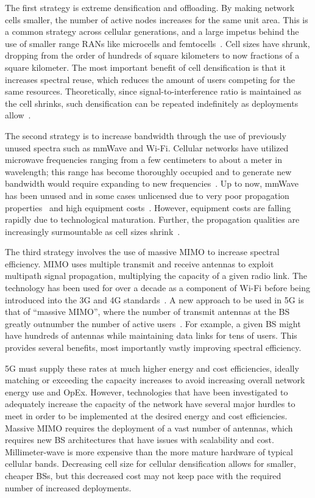 \documentclass[12pt,dvipsnames]{report}
\begin{document}
The first strategy is extreme densification and offloading.  By making network cells smaller, the number of active nodes increases for the same unit area.  This is a common strategy across cellular generations, and a large impetus behind the use of smaller range RANs like microcells and femtocells~\cite{4623708}.  Cell sizes have shrunk, dropping from the order of hundreds of square kilometers to now fractions of a square kilometer.  The most important benefit of cell densification is that it increases spectral reuse, which reduces the amount of users competing for the same resources.  Theoretically, since signal-to-interference ratio is maintained as the cell shrinks, such densification can be repeated indefinitely as deployments allow~\cite{6824752, 6171996}.

The second strategy is to increase bandwidth through the use of previously unused spectra such as mmWave and Wi-Fi.  Cellular networks have utilized microwave frequencies ranging from a few centimeters to about a meter in wavelength; this range has become thoroughly occupied and to generate new bandwidth would require expanding to new frequencies~\cite{FCC:NationalBroadbandPlan,ITU:M2078}.  Up to now, mmWave has been unused and in some cases unlicensed due to very poor propagation properties~\cite{1491267,5783993} and high equipment costs~\cite{5783993}.  However, equipment costs are falling rapidly due to technological maturation.  Further, the propagation qualities are increasingly surmountable as cell sizes shrink~\cite{6515173}.

The third strategy involves the use of massive MIMO to increase spectral efficiency.  MIMO uses multiple transmit and receive antennas to exploit multipath signal propagation, multiplying the capacity of a given radio link.  The technology has been used for over a decade as a component of Wi-Fi before being introduced into the 3G and 4G standards~\cite{6824752}.  A new approach to be used in 5G is that of ``massive MIMO'', where the number of transmit antennas at the BS greatly outnumber the number of active users~\cite{5595728}.  For example, a given BS might have hundreds of antennas while maintaining data links for tens of users.  This provides several benefits, most importantly vastly improving spectral efficiency.

5G must supply these rates at much higher energy and cost efficiencies, ideally matching or exceeding the capacity increases to avoid increasing overall network energy use and OpEx.  However, technologies that have been investigated to adequately increase the capacity of the network have several major hurdles to meet in order to be implemented at the desired energy and cost efficiencies.  Massive MIMO requires the deployment of a vast number of antennas, which requires new BS architectures that have issues with scalability and cost.  Millimeter-wave is more expensive than the more mature hardware of typical cellular bands.  Decreasing cell size for cellular densification allows for smaller, cheaper BSs, but this decreased cost may not keep pace with the required number of increased deployments.~\cite{6824752}
\end{document}
